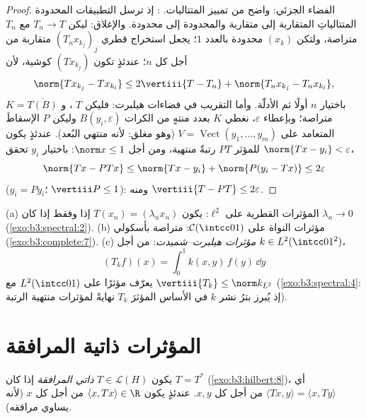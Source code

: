 \begin{proof}
الفضاء الجزئي: واضح من تمييز المتتاليات. : إذ ترسل
التطبيقات المحدودة المتتالياتِ المتقاربة إلى متقاربة والمحدودة
إلى محدودة. والإغلاق: ليكن $T_n \to T$ مع $T_n$ متراصة، ولتكن
$(x_k)$ محدودة بالعدد $1$؛ يجعل استخراج قطري
$(T_nx_{k_j})_j$ متقاربة من أجل كل $n$؛ عندئذٍ تكون
$(Tx_{k_j})$ كوشية، لأن
\[
\norm{Tx_{k_j} - Tx_{k_l}} \leq 2\vertiii{T - T_n} +
\norm{T_nx_{k_j} - T_nx_{k_l}} ,
\]
باختيار $n$ أولًا ثم الأدلّة. وأما التقريب في فضاءات هيلبرت:
فليكن $T$ ، و $K = \overline{T(B)}$ متراصة؛ وبإعطاء $\varepsilon$،
نغطي $K$ بعدد منتهٍ من الكرات $B(y_i, \varepsilon)$ وليكن $P$ الإسقاطَ
المتعامد على $V = \operatorname{Vect}(y_1, \dots, y_m)$ (وهو مغلق: لأنه منتهي البُعد). عندئذٍ يكون
للمؤثر $PT$ رتبةٌ منتهية، ومن أجل $\norm x \leq 1$: باختيار $y_i$
تحقق $\norm{Tx - y_i} <
\varepsilon$،
\[
\norm{Tx - PTx} \leq \norm{Tx - y_i} + \norm{P(y_i - Tx)}
\leq 2\varepsilon
\]
($y_i = Py_i$؛ $\vertiii P \leq 1$): ومنه $\vertiii{T - PT} \leq
2\varepsilon$.
\end{proof}

\begin{example}\label{ex:b3:spectral:examples}
(a) المؤثرات القطرية على $\ell^2$: يكون $T(x_n) = (\lambda_nx_n)$  إذا
وفقط إذا كان $\lambda_n \to 0$ (\cref{exo:b3:spectral:2}).
(b) مؤثرات النواة على $\mathcal C(\intcc01)$: متراصة بأسكولي (\cref{exo:b3:complete:7}).
(c) \emph{مؤثرات هيلبرت--شميدت}: من
أجل $k \in L^2(\intcc01^2)$،
\[
(T_kf)(x) = \int_0^1k(x, y)\,f(y)\,\dd y
\]
يعرّف مؤثرًا  على $L^2(\intcc01)$ مع
$\vertiii{T_k} \leq \norm k_{L^2}$
(\cref{exo:b3:spectral:4}: إذ يُبرز بترُ نشر $k$ في الأساس المؤثرَ $T_k$
نهايةً لمؤثرات منتهية الرتبة).
\end{example}

\section{المؤثرات ذاتية المرافقة}

\begin{definition}\label{def:b3:spectral:selfadjoint}
يكون $T \in \mathcal L(H)$ \emph{ذاتي المرافقة} إذا
كان $T = T^*$ (\cref{exo:b3:hilbert:8})، أي $\langle Tx, y\rangle = \langle x, Ty\rangle$ من أجل كل $x, y$. عندئذٍ
يكون $\langle x, Tx\rangle \in \R$ من أجل كل $x$ (لأنه يساوي مرافقه).
\end{definition}

